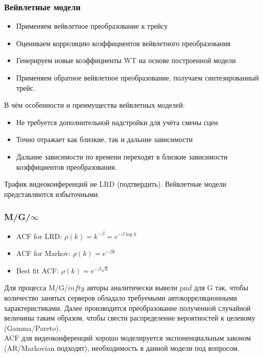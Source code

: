 \documentclass[10pt,pdf,hyperref={unicode}]{beamer}
\begin{document}
\begin{frame}
    \frametitle{Вейвлетные модели}
    \begin{itemize}
        \item Применяем вейвлетное преобразование к трейсу
        \item Оцениваем корреляцию коэффициентов вейвлетного преобразования
        \item Генерируем новые коэффициенты WT на основе построенной модели
        \item Применяем обратное вейвлетное преобразование, получаем
            синтезированный трейс.
    \end{itemize}
    В чём особенности и преимущества вейвлетных моделей:
    \begin{itemize}
        \item Не требуется дополнительной надстройки для учёта смены сцен
        \item Точно отражает как близкие, так и дальние зависимости
        \item Дальние зависимости по времени переходят в близкие
            зависимости коэффициентов преобразования.
    \end{itemize}

    Трафик видеоконференций не LRD (подтвердить). Вейвлетные модели
    представляются избыточными.
\end{frame}

\begin{frame}
    \frametitle{M/G/$\infty$}
    \begin{itemize}
        \item ACF for LRD: $\rho (k) = k^{-\beta} = e^{-\beta \log k}$
        \item ACF for Markov: $\rho(k) = e^{-\beta k}$
        \item Best fit ACF: $\rho(k) = e^{-\beta \sqrt{k}}$\\[0.5 cm]
    \end{itemize}

    Для процесса M/G/$infty$ авторы аналитически вывели pmf для
    G так, чтобы количество занятых серверов обладало требуемыми
    автокорреляционными характеристиками. Далее производится
    преобразование полученной случайной величины таким образом,
    чтобы свести распределение вероятностей к целевому (Gamma/Pareto).\\[0.5 cm]

    ACF для видеоконференций хорошо моделируется экспоненциальным законом
    (AR/Markovian подходят), необходимость в данной модели под вопросом.
\end{frame}
\end{document}
